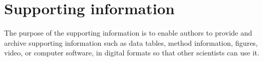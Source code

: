 \documentclass[11pt, a4paper]{article}
\begin{document}
\appendix
\section{Supporting information}
The purpose of the supporting information is to enable authors to provide and archive supporting information such as data tables, method information, figures, video, or computer software, in digital formats so that other scientists can use it.

\small \singlespacing
 

\end{document}

